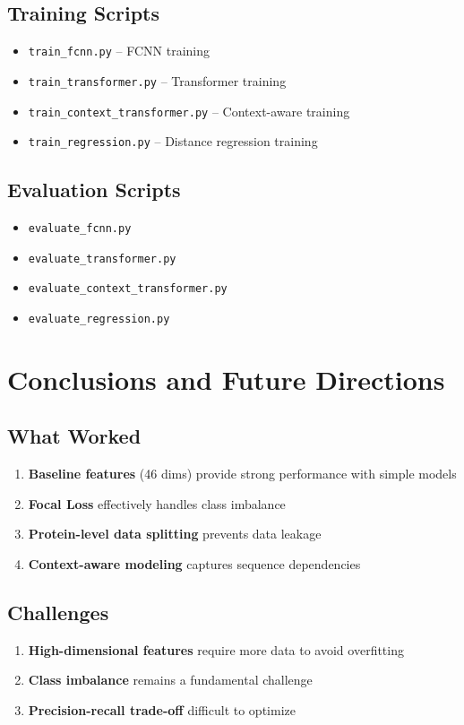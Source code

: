 \documentclass[11pt,a4paper]{article}
\begin{document}
\subsection{Training Scripts}
\begin{itemize}
    \item \texttt{train\_fcnn.py} -- FCNN training
    \item \texttt{train\_transformer.py} -- Transformer training
    \item \texttt{train\_context\_transformer.py} -- Context-aware training
    \item \texttt{train\_regression.py} -- Distance regression training
\end{itemize}

\subsection{Evaluation Scripts}
\begin{itemize}
    \item \texttt{evaluate\_fcnn.py}
    \item \texttt{evaluate\_transformer.py}
    \item \texttt{evaluate\_context\_transformer.py}
    \item \texttt{evaluate\_regression.py}
\end{itemize}

\section{Conclusions and Future Directions}

\subsection{What Worked}
\begin{enumerate}
    \item \textbf{Baseline features} (46 dims) provide strong performance with simple models
    \item \textbf{Focal Loss} effectively handles class imbalance
    \item \textbf{Protein-level data splitting} prevents data leakage
    \item \textbf{Context-aware modeling} captures sequence dependencies
\end{enumerate}

\subsection{Challenges}
\begin{enumerate}
    \item \textbf{High-dimensional features} require more data to avoid overfitting
    \item \textbf{Class imbalance} remains a fundamental challenge
    \item \textbf{Precision-recall trade-off} difficult to optimize
\end{enumerate}
\end{document}
